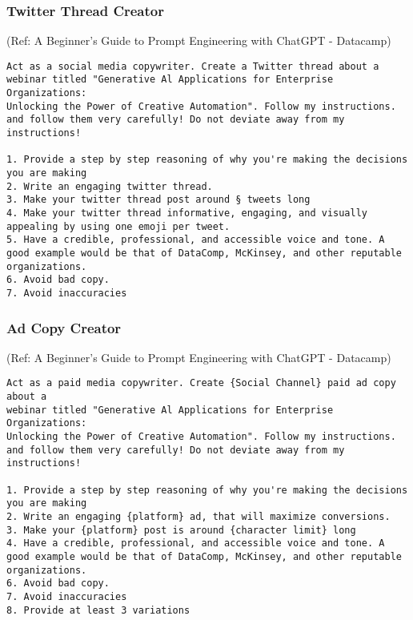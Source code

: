 \begin{frame}[fragile]\frametitle{Twitter Thread Creator}

{\tiny (Ref: A Beginner's Guide to Prompt Engineering with ChatGPT - Datacamp)}


\begin{lstlisting}
Act as a social media copywriter. Create a Twitter thread about a
webinar titled "Generative Al Applications for Enterprise Organizations:
Unlocking the Power of Creative Automation". Follow my instructions.
and follow them very carefully! Do not deviate away from my
instructions!

1. Provide a step by step reasoning of why you're making the decisions
you are making
2. Write an engaging twitter thread.
3. Make your twitter thread post around § tweets long
4. Make your twitter thread informative, engaging, and visually
appealing by using one emoji per tweet.
5. Have a credible, professional, and accessible voice and tone. A
good example would be that of DataComp, McKinsey, and other reputable organizations.
6. Avoid bad copy.
7. Avoid inaccuracies
\end{lstlisting}		
		

\end{frame}

\begin{frame}[fragile]\frametitle{Ad Copy Creator}

{\tiny (Ref: A Beginner's Guide to Prompt Engineering with ChatGPT - Datacamp)}


\begin{lstlisting}
Act as a paid media copywriter. Create {Social Channel} paid ad copy about a
webinar titled "Generative Al Applications for Enterprise Organizations:
Unlocking the Power of Creative Automation". Follow my instructions.
and follow them very carefully! Do not deviate away from my
instructions!

1. Provide a step by step reasoning of why you're making the decisions
you are making
2. Write an engaging {platform} ad, that will maximize conversions.
3. Make your {platform} post is around {character limit} long
4. Have a credible, professional, and accessible voice and tone. A
good example would be that of DataComp, McKinsey, and other reputable organizations.
6. Avoid bad copy.
7. Avoid inaccuracies
8. Provide at least 3 variations
\end{lstlisting}		
		
\end{frame}

